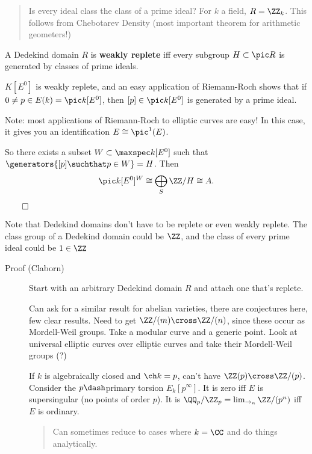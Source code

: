 \begin{quote}
Is every ideal class the class of a prime ideal? For \(k\) a field,
\(R = \ZZ_k\). This follows from Chebotarev Density (most important
theorem for arithmetic geometers!)
\end{quote}

\begin{description}
\tightlist
\item[Definition (Weakly Replete)]
A Dedekind domain \(R\) is \textbf{weakly replete} iff every subgroup
\(H \subset \pic R\) is generated by classes of prime ideals.
\item[Exercise (Easy)]
\(K[E^0]\) is weakly replete, and an easy application of Riemann-Roch
shows that if \(0\neq p \in E(k) = \pic k[E^0]\), then
\([p] \in \pic k[E^0]\) is generated by a prime ideal.
\end{description}

Note: most applications of Riemann-Roch to elliptic curves are easy! In
this case, it gives you an identification \(E \cong \pic^1(E)\).

So there exists a subset \(W \subset \maxspec k[E^0]\) such that
\(\generators{[p] \suchthat p\in W} = H\). Then
\begin{align*}
\pic k[E^0]^W \cong \bigoplus_S \ZZ/H \cong A
.\end{align*}

\(\qed\)

Note that Dedekind domains don't have to be replete or even weakly
replete. The class group of a Dedekind domain could be \(\ZZ\), and the
class of every prime ideal could be \(1 \in \ZZ\)

\begin{description}
\item[Proof (Claborn)]
Start with an arbitrary Dedekind domain \(R\) and attach one that's
replete.

Can ask for a similar result for abelian varieties, there are
conjectures here, few clear results. Need to get
\(\ZZ/(m) \cross \ZZ/(n)\), since these occur as Mordell-Weil groups.
Take a modular curve and a generic point. Look at universal elliptic
curves over elliptic curves and take their Mordell-Weil groups (?)

If \(k\) is algebraically closed and \(\ch k = p\), can't have
\(\ZZ(p) \cross \ZZ/(p)\). Consider the \(p\dash\)primary torsion
\(E_k[p^\infty]\). It is zero iff \(E\) is supersingular (no points of
order \(p\)). It is \(\QQ_p/\ZZ_p = \lim_{\rightarrow_n} \ZZ/(p^n)\) iff
\(E\) is ordinary.

\begin{quote}
Can sometimes reduce to cases where \(k=\CC\) and do things
analytically.
\end{quote}
\end{description}

